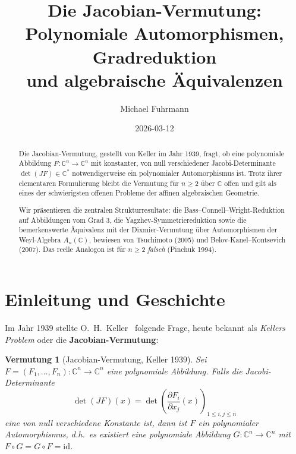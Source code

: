 \documentclass[12pt,a4paper]{amsart}
\newtheorem{vermutung}[theorem]{Vermutung}
\theoremstyle{definition}
\theoremstyle{remark}
\begin{document}
\title{Die Jacobian-Vermutung:\\
Polynomiale Automorphismen, Gradreduktion\\
und algebraische Äquivalenzen}

\author{Michael Fuhrmann}
\address{Specialist Mathematics Project, Build 166}
\date{2026-03-12}

\begin{abstract}
Die Jacobian-Vermutung, gestellt von Keller im Jahr 1939, fragt, ob eine polynomiale
Abbildung $F \colon \mathbb{C}^n \to \mathbb{C}^n$ mit konstanter, von null verschiedener
Jacobi-Determinante $\det(JF) \in \mathbb{C}^*$ notwendigerweise ein polynomialer
Automorphismus ist. Trotz ihrer elementaren Formulierung bleibt die Vermutung für
$n \geq 2$ über $\mathbb{C}$ offen und gilt als eines der schwierigsten offenen Probleme
der affinen algebraischen Geometrie.

Wir präsentieren die zentralen Strukturresultate: die Bass--Connell--Wright-Reduktion
auf Abbildungen vom Grad 3, die Yagzhev-Symmetriereduktion sowie die bemerkenswerte
Äquivalenz mit der Dixmier-Vermutung über Automorphismen der Weyl-Algebra
$A_n(\mathbb{C})$, bewiesen von Tsuchimoto (2005) und Belov-Kanel--Kontsevich (2007).
Das reelle Analogon ist für $n \geq 2$ \emph{falsch} (Pinchuk 1994).
\end{abstract}

\maketitle

\tableofcontents

\section{Einleitung und Geschichte}

Im Jahr 1939 stellte O.~H.\ Keller~\cite{Keller1939} folgende Frage, heute bekannt
als \emph{Kellers Problem} oder die \textbf{Jacobian-Vermutung}:

\begin{vermutung}[Jacobian-Vermutung, Keller 1939]\label{verm:JV}
Sei $F = (F_1,\ldots,F_n) \colon \mathbb{C}^n \to \mathbb{C}^n$ eine polynomiale
Abbildung. Falls die Jacobi-Determinante
\[
  \det(JF)(x) = \det\!\left(\frac{\partial F_i}{\partial x_j}(x)\right)_{1\leq i,j\leq n}
\]
eine von null verschiedene Konstante ist, dann ist $F$ ein polynomialer Automorphismus,
d.h.\ es existiert eine polynomiale Abbildung $G \colon \mathbb{C}^n \to \mathbb{C}^n$
mit $F \circ G = G \circ F = \mathrm{id}$.
\end{vermutung}
\end{document}
